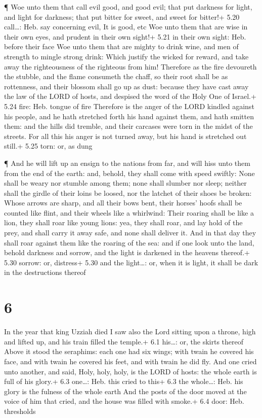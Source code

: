  ¶ Woe unto them that call evil good, and good evil; that
put darkness for light, and light for darkness; that put bitter for
sweet, and sweet for bitter!+ 5.20 call\ldots: Heb. say concerning evil,
It is good, etc  Woe unto them that are wise in their own
eyes, and prudent in their own sight!+ 5.21 in their own sight: Heb.
before their face  Woe unto them that are mighty to drink
wine, and men of strength to mingle strong drink:  Which
justify the wicked for reward, and take away the righteousness of the
righteous from him!  Therefore as the fire devoureth the
stubble, and the flame consumeth the chaff, so their root shall be as
rottenness, and their blossom shall go up as dust: because they have
cast away the law of the LORD of hosts, and despised the word of the
Holy One of Israel.+ 5.24 fire: Heb. tongue of fire 
Therefore is the anger of the LORD kindled against his people, and he
hath stretched forth his hand against them, and hath smitten them: and
the hills did tremble, and their carcases were torn in the midst of the
streets. For all this his anger is not turned away, but his hand is
stretched out still.+ 5.25 torn: or, as dung

 ¶ And he will lift up an ensign to the nations from far,
and will hiss unto them from the end of the earth: and, behold, they
shall come with speed swiftly:  None shall be weary nor
stumble among them; none shall slumber nor sleep; neither shall the
girdle of their loins be loosed, nor the latchet of their shoes be
broken:  Whose arrows are sharp, and all their bows bent,
their horses' hoofs shall be counted like flint, and their wheels like a
whirlwind:  Their roaring shall be like a lion, they shall
roar like young lions: yea, they shall roar, and lay hold of the prey,
and shall carry it away safe, and none shall deliver it. 
And in that day they shall roar against them like the roaring of the
sea: and if one look unto the land, behold darkness and sorrow, and the
light is darkened in the heavens thereof.+ 5.30 sorrow: or, distress+
5.30 and the light\ldots: or, when it is light, it shall be dark in the
destructions thereof

\hypertarget{section-5}{%
\section{6}\label{section-5}}

 In the year that king Uzziah died I saw also the Lord
sitting upon a throne, high and lifted up, and his train filled the
temple.+ 6.1 his\ldots: or, the skirts thereof  Above it
stood the seraphims: each one had six wings; with twain he covered his
face, and with twain he covered his feet, and with twain he did fly.
 And one cried unto another, and said, Holy, holy, holy, is
the LORD of hosts: the whole earth is full of his glory.+ 6.3 one\ldots:
Heb. this cried to this+ 6.3 the whole\ldots: Heb. his glory is the
fulness of the whole earth  And the posts of the door moved
at the voice of him that cried, and the house was filled with smoke.+
6.4 door: Heb. thresholds

